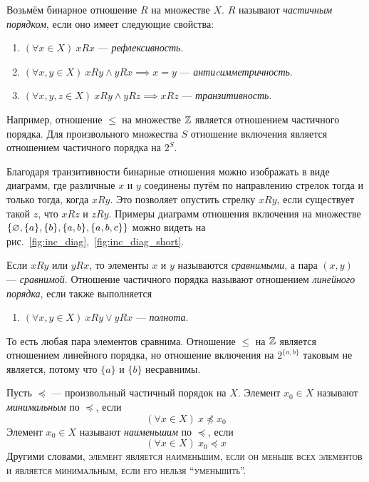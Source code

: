 Возьмём бинарное отношение $R$ на множестве $X$. $R$ называют
{\it частичным порядком},
если оно имеет следующие свойства:
\begin{enumerate}
  \item{}$(\forall x\in X)~xRx$ --- {\it рефлексивность}.
  \item{}$(\forall x,y\in X)~xRy\land yRx\implies x=y$
  --- {\it антиcимметричность}.
  \item{}$(\forall x,y,z\in X)~xRy\land yRz\implies xRz$
  --- {\it транзитивность}.
\end{enumerate}
Например, отношение $\leq$ на множестве $\mathbb Z$ является отношением частичного порядка.
Для произвольного множества $S$ отношение включения является
отношением частичного порядка на $2^{S}$.

Благодаря транзитивности бинарные отношения можно изображать в виде диаграмм, где
различные $x$ и $y$ соединены путём по направлению стрелок тогда и только
тогда, когда $xRy$.
Это позволяет опустить стрелку $xRy$, если существует такой $z$, что $xRz$ и $zRy$.
Примеры диаграмм отношения включения на множестве
$\{\varnothing,\{a\},\{b\},\{a,b\}, \{a,b,c\}\}$
можно видеть на рис.~\ref{fig:inc_diag},~\ref{fig:inc_diag_short}.

Если $xRy$ или $yRx$, то элементы $x$ и $y$ называются
{\it сравнимыми}, а пара $(x,y)$ --- {\it сравнимой}.
Отношение частичного порядка называют
отношением {\it линейного порядка}, если также выполняется
\begin{enumerate}[resume*]
  \item{}$(\forall x,y\in X)~xRy\lor yRx$ --- {\it полнота}.
\end{enumerate}
То есть любая пара элементов сравнима. Отношение $\leq$ на $\mathbb Z$
является отношением линейного порядка,
но отношение включения на $2^{\{a,b\}}$ таковым не является,
потому что $\{a\}$ и $\{b\}$ несравнимы.

Пусть $\preceq$ --- произвольный частичный порядок на $X$.
Элемент $x_0\in X$ называют {\it минимальным}
по $\preceq$, если
\[
  (\forall x\in X)~x\npreceq x_0
\]
Элемент $x_0\in X$ называют {\it наименьшим}
 по $\preceq$, если
\[
  (\forall x\in X)~x_0\preceq x
\]
Другими словами, \textsc{элемент является наименьшим,
  если он меньше всех элементов и является минимальным, если его нельзя
  ``уменьшить''.}

